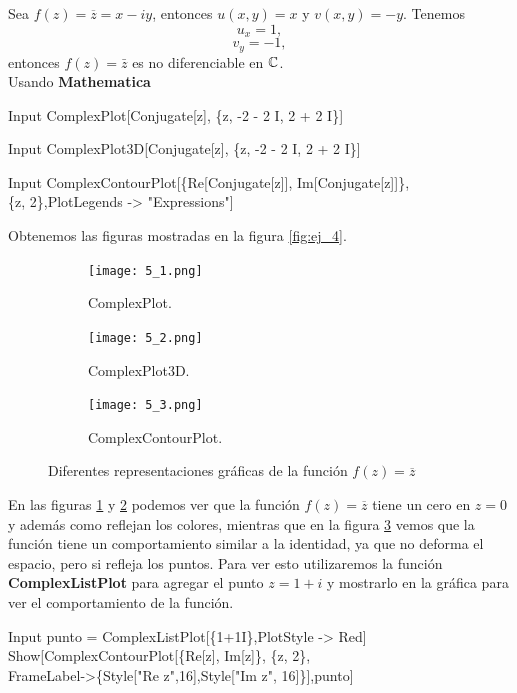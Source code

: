 \begin{Ejem}
	Sea $f(z)=\overline{z}=x-iy$, entonces $u(x,y)=x$ y $v(x,y)=-y$. Tenemos
	$$u_x=1,$$
	$$v_y=-1,$$
   entonces $f(z)=\bar{z}$ es no diferenciable en $\mathbb{C}$.\\
	Usando \textbf{Mathematica}
	\begin{mmaCell}{Input}
		ComplexPlot[Conjugate[z], \{z, -2 - 2 I, 2 + 2 I\}]
	\end{mmaCell}
	
	\begin{mmaCell}{Input}
		ComplexPlot3D[Conjugate[z], \{z, -2 - 2 I, 2 + 2 I\}]
	\end{mmaCell}
	
	\begin{mmaCell}{Input}
		ComplexContourPlot[\{Re[Conjugate[z]], Im[Conjugate[z]]\}, \\\{z, 2\},PlotLegends -> "Expressions"]
	\end{mmaCell}
	Obtenemos las figuras mostradas en la figura \ref{fig:ej_4}.\\	
	\begin{figure}[htbp!]
		\centering
		\begin{subfigure}{0.25\textwidth}
			\texttt{[image: 5\_1.png]}
			\caption{ComplexPlot.}
			\label{fig:ej_5_1}
		\end{subfigure}
		\begin{subfigure}{0.25\textwidth}
			\texttt{[image: 5\_2.png]}
			\caption{ComplexPlot3D.}
			\label{fig:ej_5_2}
		\end{subfigure}
		\begin{subfigure}{0.25\textwidth}
			\texttt{[image: 5\_3.png]}
			\caption{ComplexContourPlot.}
			\label{fig:ej_5_3}
		\end{subfigure}
		\caption{Diferentes representaciones gráficas de la función $f(z)=\overline{z}$}
		\label{fig:ej_5}
	\end{figure}
	
	En las figuras \ref{fig:ej_5_1} y \ref{fig:ej_5_2} podemos ver que la función $f(z)=\overline{z}$ tiene un cero en $z=0$ y además como reflejan los colores, mientras que en la figura \ref{fig:ej_5_3} vemos que la función tiene un comportamiento similar a la identidad, ya que no deforma el espacio, pero si refleja los puntos.  Para ver esto utilizaremos la función \textbf{ComplexListPlot} para agregar el punto $z=1+i$ y mostrarlo en la gráfica para ver el comportamiento de la función.
	\begin{mmaCell}{Input}
		punto = ComplexListPlot[\{1+1I\},PlotStyle -> Red]\\Show[ComplexContourPlot[\{Re[z], Im[z]\}, \{z, 2\},\\FrameLabel->\{Style["Re z",16],Style["Im z", 16]\}],punto]
	\end{mmaCell}
	

\end{Ejem}

